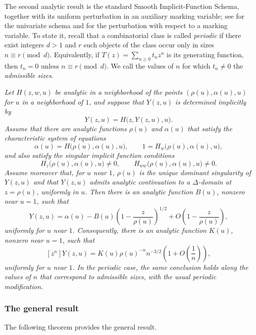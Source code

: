 \documentclass[10pt,a4paper]{amsart}
\theoremstyle{remark}
\begin{document}
The second analytic result is the standard Smooth Implicit-Function Schema, together with its uniform perturbation in an auxiliary marking variable; see \cite[Section VII.4.1 and Theorem VII.3]{FlajoletSedgewick} for the univariate schema and \cite[Section IX.7]{FlajoletSedgewick} for the perturbation with respect to a marking variable. To state it, recall that a combinatorial class is called \emph{periodic} if there exist integers $d>1$ and $r$ such objects of the class occur only in sizes $n\equiv r\pmod d$. Equivalently, if $T(z)=\sum_{n\geq 0} t_n z^n$ is its generating function, then $t_n=0$ unless $n\equiv r\pmod d$. We call the values of $n$ for which $t_n\neq 0$ the \emph{admissible sizes}.

\emph{
Let $H(z,w,u)$ be analytic in a neighborhood of the points
$(\rho(u),\alpha(u),u)$ for $u$ in a neighborhood of $1$, and suppose that
$Y(z,u)$ is determined implicitly by
\[
Y(z,u)=H\big(z,Y(z,u),u\big).
\]
Assume that there are analytic functions $\rho(u)$ and $\alpha(u)$ that satisfy the characteristic system of equations
\[
\alpha(u)=H\big(\rho(u),\alpha(u),u\big),
\qquad
1=H_w\big(\rho(u),\alpha(u),u\big),
\]
and also satisfy the singular implicit function conditions
\[
H_z\big(\rho(u),\alpha(u),u\big)\neq 0,
\qquad
H_{ww}\big(\rho(u),\alpha(u),u\big)\neq 0.
\]
Assume moreover that, for $u$ near $1$, $\rho(u)$ is the unique dominant
singularity of $Y(z,u)$ and that $Y(z,u)$ admits analytic continuation to a
$\Delta$-domain at $z=\rho(u)$, uniformly in $u$. Then there is an analytic
function $B(u)$, nonzero near $u=1$, such that
\[
Y(z,u)=\alpha(u)-B(u)\left(1-\frac{z}{\rho(u)}\right)^{1/2}
+O\left(1-\frac{z}{\rho(u)}\right),
\]
uniformly for $u$ near $1$. Consequently, there is an analytic function
$K(u)$, nonzero near $u=1$, such that
\[
[z^n]Y(z,u)
=K(u)\rho(u)^{-n}n^{-3/2}
\left(1+O\left(\frac1n\right)\right),
\]
uniformly for $u$ near $1$. In the periodic case, the same conclusion holds
along the values of $n$ that correspond to admissible sizes, with the usual periodic modification.
}

\subsubsection{The general result}\label{subsubsec:generalresult}
 The following theorem provides the general result. 
\end{document}

